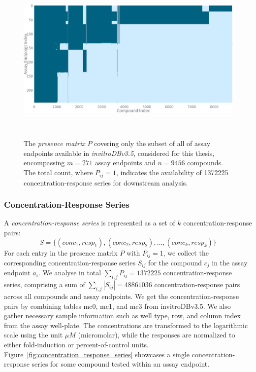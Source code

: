\begin{figure}[h]  %
    \centering
    \includegraphics[width=1.0\textwidth]{figures/presence_matrix_subset.png}  
    \caption{The \emph{presence matrix} $P$ covering only the subset of all of assay endpoints available in \textit{invitroDBv3.5}, considered for this thesis, encompassing $m = \num{271}$ assay endpoints and $n = \num{9456}$ compounds. The total count, where $P_{ij} = 1$, indicates the availability of \num{1372225} concentration-response series for downstream analysis.}
~\label{fig:presence_matrix_subset} 
\end{figure}


\subsubsection{Concentration-Response Series}
A \textit{concentration-response series} is represented as a set of $k$ concentration-response pairs: 
\[ S = \{(conc_1, resp_1), (conc_2, resp_2), \dots, (conc_k, resp_k)\} \]
For each entry in the presence matrix $P$ with $P_{ij} = 1$, we collect the corresponding concentration-response series $S_{ij}$ for the compound $c_j$ in the assay endpoint $a_i$. We analyse in total $\sum_{i,j} P_{ij} = \num{1372225}$ concentration-response series, comprising a sum of $\sum_{i,j} |S_{ij}| = \num{48861036}$ concentration-response pairs across all compounds and assay endpoints.
We get the concentration-response pairs by combining tables mc0, mc1, and mc3 from invitroDBv3.5. We also gather necessary sample information such as well type, row, and column index from the assay well-plate.
The concentrations are transformed to the logarithmic scale using the unit $\mu M$ (micromolar), while the responses are normalized to either fold-induction or percent-of-control units.
Figure~\ref{fig:concentration_response_series} showcases a single concentration-response series for some compound tested within an assay endpoint.

